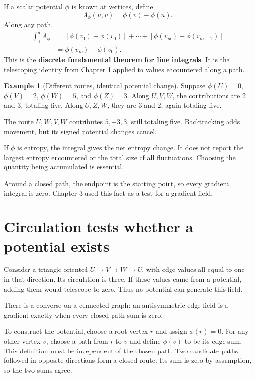 \documentclass[11pt,oneside,openany]{book}
\theoremstyle{definition}
\newtheorem{example}{Example}[chapter]
\theoremstyle{remark}
\numberwithin{equation}{chapter}
\begin{document}
If a scalar potential \(\phi\) is known at vertices, define \[A_\phi(u,v)=\phi(v)-\phi(u).\] Along any path, \[\begin{aligned}
\int_\gamma^d A_\phi
&=[\phi(v_1)-\phi(v_0)]+\cdots+[\phi(v_m)-\phi(v_{m-1})]\\
&=\phi(v_m)-\phi(v_0).
\end{aligned}\] This is the \textbf{discrete fundamental theorem for line integrals}. It is the telescoping identity from Chapter 1 applied to values encountered along a path.

\begin{example}[Different routes, identical potential change]

Suppose \(\phi(U)=0\), \(\phi(V)=2\), \(\phi(W)=5\), and \(\phi(Z)=3\). Along \(U,V,W\), the contributions are \(2\) and \(3\), totaling five. Along \(U,Z,W\), they are \(3\) and \(2\), again totaling five.

The route \(U,W,V,W\) contributes \(5,-3,3\), still totaling five. Backtracking adds movement, but its signed potential changes cancel.

\end{example}

If \(\phi\) is entropy, the integral gives the net entropy change. It does not report the largest entropy encountered or the total size of all fluctuations. Choosing the quantity being accumulated is essential.

Around a closed path, the endpoint is the starting point, so every gradient integral is zero. Chapter 3 used this fact as a test for a gradient field.

\section{Circulation tests whether a potential exists}\label{ch08-circulation-tests-whether-a-potential-exists}

Consider a triangle oriented \(U\to V\to W\to U\), with edge values all equal to one in that direction. Its circulation is three. If these values came from a potential, adding them would telescope to zero. Thus no potential can generate this field.

There is a converse on a connected graph: an antisymmetric edge field is a gradient exactly when every closed-path sum is zero.

To construct the potential, choose a root vertex \(r\) and assign \(\phi(r)=0\). For any other vertex \(v\), choose a path from \(r\) to \(v\) and define \(\phi(v)\) to be its edge sum. This definition must be independent of the chosen path. Two candidate paths followed in opposite directions form a closed route. Its sum is zero by assumption, so the two sums agree.
\end{document}
